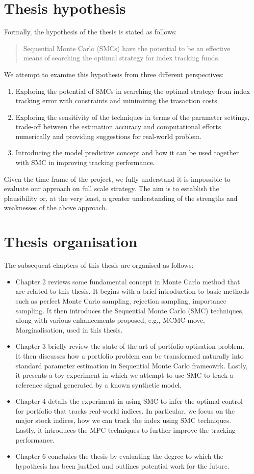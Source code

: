 \section{Thesis hypothesis}
Formally, the hypothesis of the thesis is stated as follows:
\begin{quote}
Sequential Monte Carlo (SMCs) have the potential to be an effective means of searching the optimal strategy for index tracking funds.
\end{quote}
We attempt to examine this hypothesis from three different perspectives:
\begin{enumerate}
\item Exploring the potential of SMCs in searching the optimal strategy from index tracking error with constraints and minimizing the trasaction costs.
\item Exploring the sensitivity of the techniques in terms of the parameter settings, trade-off between the estimation accuracy and computational efforts numerically and providing suggestions for real-world problem.
\item Introducing the model predictive concept and how it can be used together with SMC in improving tracking performance.
\end{enumerate}
Given the time frame of the project, we fully understand it is impossible to evaluate our approach on full scale strategy. The aim is to establish the plausibility or, at the very least, a greater understanding of the strengths and weaknesses of the above approach.

\section{Thesis organisation}
The subsequent chapters of this thesis are organised as follows:
\begin{itemize}
\item Chapter 2 reviews some fundamental concept in Monte Carlo method that are related to this thesis. It begins with a brief introduction to basic methods such as perfect Monte Carlo sampling, rejection sampling, importance sampling. It then  introduces the Sequential Monte Carlo (SMC) techniques, along with various enhancements proposed, e.g., MCMC move, Marginalisation, used in this thesis.
\item Chapter 3 briefly review the state of the art of portfolio optisation problem. It then discusses how a portfolio problem can be transformed naturally into standard parameter estimation in Sequential Monte Carlo frameowrk.
Lastly, it presents a toy experiment in which we attempt to use SMC to track a reference signal generated by a known synthetic model. 
\item Chapter 4 details the experiment in using SMC to infer the optimal control for portfolio that tracks real-world indices. In particular, we focus on the major stock indices, how we can track the index using SMC techniques. Lastly, it introduces the MPC techniques to further improve the tracking performance.
\item Chapter 6 concludes the thesis by evaluating the degree to which the hypothesis has been justfied and outlines potential work for the future.
\end{itemize}



